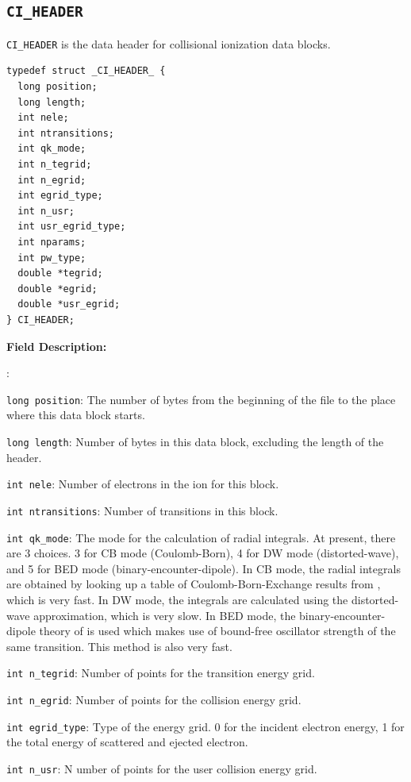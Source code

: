 \documentclass[twoside,letterpaper]{refrep}
\newenvironment{dbdesc}{\textbf{Field Description:} \begin{list}
	{:}{\setlength{\labelwidth}{2in}
	   \setlength{\leftmargin}{2in}
	   \setlength{\labelsep}{0.1in}
	   \setlength{\rightmargin}{0.2in}}}
	{\end{list}}
\begin{document}
\subsection{\texttt{CI\_HEADER}}
\texttt{CI\_HEADER} is the data header for collisional ionization data blocks.

\begin{verbatim}
typedef struct _CI_HEADER_ {
  long position;
  long length;
  int nele;
  int ntransitions;
  int qk_mode;
  int n_tegrid;
  int n_egrid;
  int egrid_type;
  int n_usr;
  int usr_egrid_type;
  int nparams;
  int pw_type;
  double *tegrid;
  double *egrid;
  double *usr_egrid;
} CI_HEADER;
\end{verbatim}

\begin{dbdesc}
\item[\texttt{long position}:] The number of bytes from the beginning of the
file to the place where this data block starts.
\item[\texttt{long length}:] Number of bytes in this data block, excluding the
length of the header.
\item[\texttt{int nele}:] Number of electrons in the ion for this block.
\item[\texttt{int ntransitions}:] Number of transitions in this block.
\item[\texttt{int qk\_mode}:] The mode for the calculation of radial
integrals. At present, there are 3 choices. 3 for CB mode (Coulomb-Born), 4
for DW mode (distorted-wave), and 5 for BED mode (binary-encounter-dipole). In
CB mode, the radial integrals are obtained by looking up a table of
Coulomb-Born-Exchange results from \citet{golden77,golden80}, which is very
fast. In DW mode, the integrals are calculated using the distorted-wave
approximation, which is very slow. In BED mode, the binary-encounter-dipole
theory of \citet{kim94} is used which makes use of bound-free oscillator
strength of the same transition. This method is also very fast.
\item[\texttt{int n\_tegrid}:] Number of points for the transition energy grid.
\item[\texttt{int n\_egrid}:] Number of points for the collision energy grid.
\item[\texttt{int egrid\_type}:] Type of the energy grid. 0 for the incident
electron energy, 1 for the total energy of scattered and ejected electron.
\item[\texttt{int n\_usr}:]N umber of points for the user collision energy
grid.

\end{dbdesc}
\end{document}

